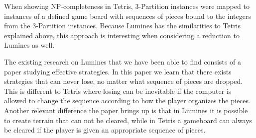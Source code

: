 When showing NP-completeness in Tetris, 3-Partition instances were mapped to instances of a defined game board with sequences of pieces bound to the integers from the 3-Partition instances. Because Lumines has the similarities to Tetris explained above, this approach is interesting when considering a reduction to Lumines as well.

The existing research on Lumines that we have been able to find consists of a paper studying effective strategies. In this paper we learn that there exists strategies that can never lose, no matter what sequence of pieces are dropped. This is different to Tetris where losing can be inevitable if the computer is allowed to change the sequence according to how the player organizes the pieces. Another relevant difference the paper brings up is that in Lumines it is possible to create terrain that can not be cleared, while in Tetris a gameboard can always be cleared if the player is given an appropriate sequence of pieces.
